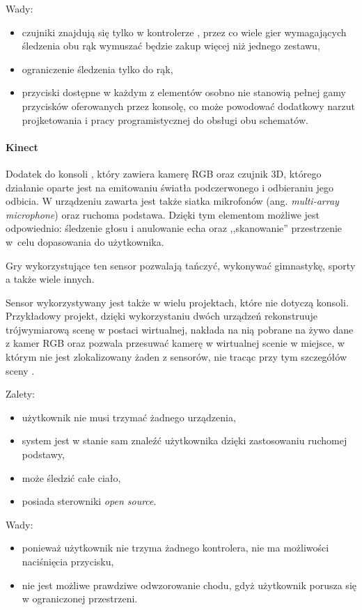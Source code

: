Wady:
\begin{itemize}
  \item czujniki znajdują się tylko w kontrolerze , przez co wiele gier wymagających śledzenia obu rąk wymuszać będzie zakup więcej niż jednego zestawu,
  \item ograniczenie śledzenia tylko do rąk,
  \item przyciski dostępne w każdym z elementów osobno nie stanowią pełnej gamy przycisków oferowanych przez konsolę, co może powodować dodatkowy narzut projketowania i pracy programistycznej do obsługi obu schematów.
\end{itemize}

\paragraph{Kinect}
Dodatek do konsoli , który zawiera kamerę RGB oraz czujnik 3D, którego działanie oparte jest na emitowaniu światła podczerwonego i odbieraniu jego odbicia. W urządzeniu zawarta jest także siatka mikrofonów (ang. \textsl{multi-array microphone}) oraz ruchoma podstawa. Dzięki tym elementom możliwe jest odpowiednio: śledzenie głosu i anulowanie echa oraz ,,skanowanie'' przestrzenie w~celu dopasowania do użytkownika.

Gry wykorzystujące ten sensor pozwalają tańczyć, wykonywać gimnastykę, sporty a także wiele innych.

Sensor wykorzystywany jest także w wielu projektach, które nie dotyczą konsoli. Przykładowy projekt, dzięki wykorzystaniu dwóch urządzeń  rekonstruuje trójwymiarową scenę w postaci wirtualnej, nakłada na nią pobrane na żywo dane z kamer RGB oraz pozwala przesuwać kamerę w wirtualnej scenie w miejsce, w którym nie jest zlokalizowany żaden z sensorów, nie tracąc przy tym szczegółów sceny \citep{TwoKinects}.

Zalety:
\begin{itemize}
  \item użytkownik nie musi trzymać żadnego urządzenia,
  \item system jest w stanie sam znaleźć użytkownika dzięki zastosowaniu ruchomej podstawy,
  \item może śledzić całe ciało,
  \item posiada sterowniki \textsl{open source}.
\end{itemize}

Wady:
\begin{itemize}
  \item ponieważ użytkownik nie trzyma żadnego kontrolera, nie ma możliwości naciśnięcia przycisku,
  \item nie jest możliwe prawdziwe odwzorowanie chodu, gdyż użytkownik porusza się w ograniczonej przestrzeni.
\end{itemize}


